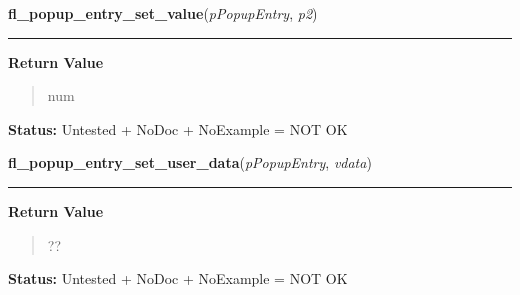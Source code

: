     \vspace{0.5ex}

\hspace{.8\funcindent}\begin{boxedminipage}{\funcwidth}

    \raggedright \textbf{fl\_popup\_entry\_set\_value}(\textit{pPopupEntry}, \textit{p2})

    \vspace{-1.5ex}

    \rule{\textwidth}{0.5\fboxrule}
\setlength{\parskip}{2ex}
\setlength{\parskip}{1ex}
      \textbf{Return Value}
    \vspace{-1ex}

      \begin{quote}
      num

      \end{quote}

\textbf{Status:} Untested + NoDoc + NoExample = NOT OK



    \end{boxedminipage}

    \label{xformslib:library:fl_popup_entry_set_user_data}

    \vspace{0.5ex}

\hspace{.8\funcindent}\begin{boxedminipage}{\funcwidth}

    \raggedright \textbf{fl\_popup\_entry\_set\_user\_data}(\textit{pPopupEntry}, \textit{vdata})

    \vspace{-1.5ex}

    \rule{\textwidth}{0.5\fboxrule}
\setlength{\parskip}{2ex}
\setlength{\parskip}{1ex}
      \textbf{Return Value}
    \vspace{-1ex}

      \begin{quote}
      ??

      \end{quote}

\textbf{Status:} Untested + NoDoc + NoExample = NOT OK



    \end{boxedminipage}

